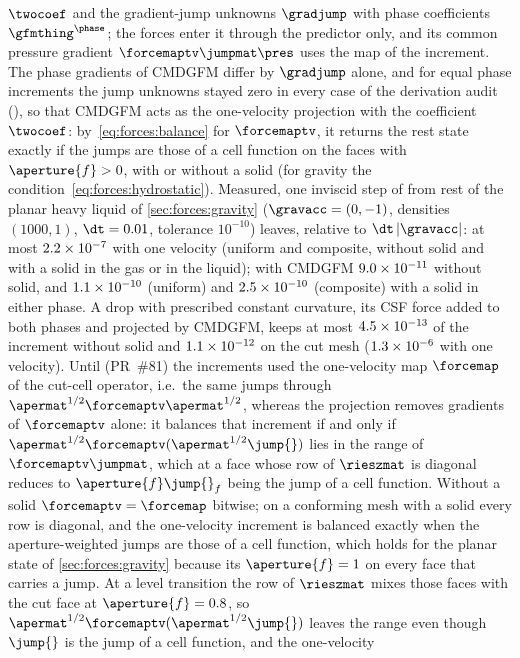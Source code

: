 $\twocoef$ and the gradient-jump unknowns $\gradjump$ with phase
coefficients $\gfmthing^{\phase}$; the forces enter it through the predictor
only, and its common pressure gradient $\forcemaptv\jumpmat\pres$ uses the
map of the increment. The phase gradients of CMDGFM differ by $\gradjump$
alone, and for equal phase increments the jump unknowns stayed zero in every
case of the derivation audit (),
so that CMDGFM acts as the one-velocity projection with the coefficient
$\twocoef$: by~\cref{eq:forces:balance} for $\forcemaptv$, it returns the
rest state exactly if the jumps are those of a cell function on the faces
with $\aperture{f}>0$, with or without a solid (for gravity the
condition~\cref{eq:forces:hydrostatic}). Measured, one inviscid step of
 from rest of the planar heavy liquid of
\cref{sec:forces:gravity} ($\gravacc=(0,-1)$, densities $(1000,1)$,
$\dt=0.01$, tolerance $10^{-10}$) leaves, relative to $\dt\abs{\gravacc}$:
at most $2.2\times10^{-7}$ with one velocity (uniform and composite, without
solid and with a solid in the gas or in the liquid); with CMDGFM
$9.0\times10^{-11}$ without solid, and $1.1\times10^{-10}$ (uniform)
and $2.5\times10^{-10}$ (composite) with a solid in either phase. A drop with prescribed constant curvature,
its CSF force added to both phases and projected by CMDGFM, keeps at most
$4.5\times10^{-13}$ of the increment without solid and
$1.1\times10^{-12}$ on the cut mesh ($1.3\times10^{-6}$ with one
velocity). Until  (PR~\#81) the increments used the one-velocity
map $\forcemap$ of the cut-cell operator, i.e.\ the same jumps through
$\apermat^{1/2}\forcemaptv\apermat^{1/2}$, whereas the projection removes
gradients of $\forcemaptv$ alone: it balances that increment if and only if
$\apermat^{1/2}\forcemaptv(\apermat^{1/2}\jump{})$ lies in the range of
$\forcemaptv\jumpmat$, which at a face whose row of $\rieszmat$ is diagonal
reduces to $\aperture{f}\jump{}_f$ being the jump of a cell function.
Without a solid $\forcemaptv=\forcemap$ bitwise; on a conforming mesh with
a solid every row is diagonal, and the one-velocity increment is balanced
exactly when the aperture-weighted jumps are those of a cell function, which
holds for the planar state of \cref{sec:forces:gravity} because its
$\aperture{f}=1$ on every face that carries a jump. At a level transition
the row of $\rieszmat$ mixes those faces with the cut face at
$\aperture{f}=0.8$, so
$\apermat^{1/2}\forcemaptv(\apermat^{1/2}\jump{})$ leaves the range even
though $\jump{}$ is the jump of a cell function, and the one-velocity
